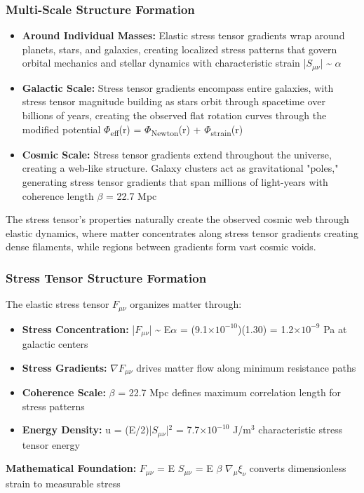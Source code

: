 \documentclass[11pt,a4paper]{article}
\begin{document}
\subsubsection{Multi-Scale Structure Formation}
\begin{itemize}
  \item \textbf{Around Individual Masses:} Elastic stress tensor gradients wrap around planets, stars, and galaxies, creating localized stress patterns that govern orbital mechanics and stellar dynamics with characteristic strain |$S_{\mu\nu}$| \~{} $\alpha$
  \item \textbf{Galactic Scale:} Stress tensor gradients encompass entire galaxies, with stress tensor magnitude building as stars orbit through spacetime over billions of years, creating the observed flat rotation curves through the modified potential $\Phi$\textsubscript{eff}(r) = $\Phi$\textsubscript{Newton}(r) + $\Phi$\textsubscript{strain}(r)
  \item \textbf{Cosmic Scale:} Stress tensor gradients extend throughout the universe, creating a web-like structure. Galaxy clusters act as gravitational "poles," generating stress tensor gradients that span millions of light-years with coherence length $\beta$ = 22.7 Mpc
\end{itemize}

The stress tensor's properties naturally create the observed cosmic web through elastic dynamics, where matter concentrates along stress tensor gradients creating dense filaments, while regions between gradients form vast cosmic voids.

\begin{mdframed}[linecolor=accent,linewidth=0.5pt,backgroundcolor=callout-bg,leftline=true,rightline=true,topline=true,bottomline=true,innerleftmargin=8pt,innerrightmargin=8pt,innertopmargin=6pt,innerbottommargin=6pt]
\subsubsection{Stress Tensor Structure Formation}
The elastic stress tensor $F_{\mu\nu}$ organizes matter through:

\begin{itemize}
  \item \textbf{Stress Concentration:} |$F_{\mu\nu}$| \~{} E$\alpha$ = (9.1$\times$$10^{-10}$)(1.30) = 1.2$\times$$10^{-9}$ Pa at galactic centers
  \item \textbf{Stress Gradients:} $\nabla$$F_{\mu\nu}$ drives matter flow along minimum resistance paths
  \item \textbf{Coherence Scale:} $\beta$ = 22.7 Mpc defines maximum correlation length for stress patterns
  \item \textbf{Energy Density:} u = (E/\allowbreak{}2)|$S_{\mu\nu}$|$^{2}$ = 7.7$\times$$10^{-10}$ J/\allowbreak{}m$^{3}$ characteristic stress tensor energy
\end{itemize}

\textbf{Mathematical Foundation:} $F_{\mu\nu}$ = E $S_{\mu\nu}$ = E $\beta$ $\nabla_\mu$$\xi_\nu$ converts dimensionless strain to measurable stress
\end{mdframed}
\end{document}
